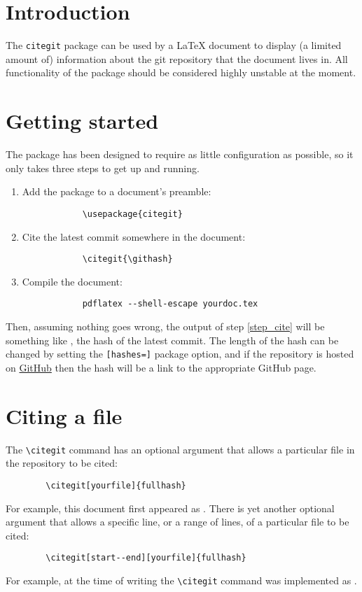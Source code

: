 \documentclass[12pt,a4paper]{article}
\begin{document}
	\section*{Introduction}
	The \verb+citegit+ package can be used by a \LaTeX{} document to display
	(a limited amount of) information about the git repository that the document
	lives in. All functionality of the package should be considered highly
	unstable at the moment.
	\section*{Getting started}
	The package has been designed to require as little configuration as possible,
	so it only takes three steps to get up and running.
	\begin{enumerate}
		\item
		\label{step_package}
		Add the package to a document's preamble:
		\begin{verbatim}
			\usepackage{citegit}
		\end{verbatim}
		\item
		\label{step_cite}
		Cite the latest commit somewhere in the document:
		\begin{verbatim}
			\citegit{\githash}
		\end{verbatim}
		\item
		\label{step_compile}
		Compile the document:
		\begin{verbatim}
			pdflatex --shell-escape yourdoc.tex
		\end{verbatim}
	\end{enumerate}
	Then, assuming nothing goes wrong, the output of step
	\ref{step_cite} will be something like \citegit{\githash}, the hash of the
	latest commit. The length of the hash can be changed by setting
	the \verb+[hashes=]+ package option, and if the repository is hosted on
	\href{https://github.com}{GitHub} then the hash will be a link to the
	appropriate GitHub page.

	\section*{Citing a file}
	The \verb+\citegit+ command has an optional argument that allows a particular
	file in the repository to be cited:
	\begin{verbatim}
		\citegit[yourfile]{fullhash}
	\end{verbatim}
	For example, this document first appeared as
	.
	There is yet another optional argument that allows a specific line, or a
	range of lines, of a particular file to be cited:
	\begin{verbatim}
		\citegit[start--end][yourfile]{fullhash}
	\end{verbatim}
	For example, at the time of writing the \verb+\citegit+ command
	was implemented as
	.
\end{document}
